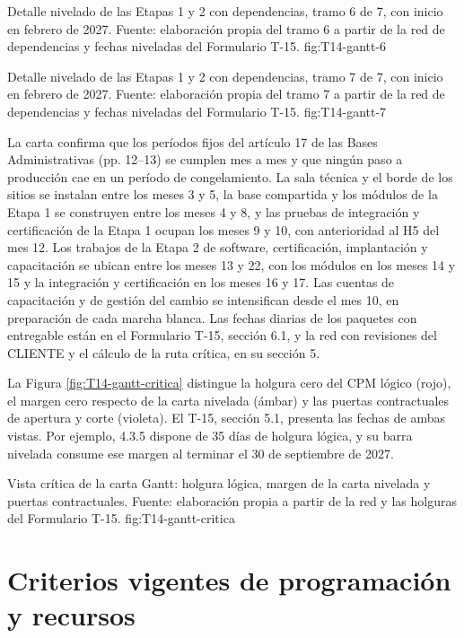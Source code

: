   {Detalle nivelado de las Etapas 1 y 2 con dependencias, tramo 6 de 7, con inicio en febrero de 2027. Fuente: elaboración propia del tramo 6 a partir de la red de dependencias y fechas niveladas del Formulario T-15.}
  {fig:T14-gantt-6}

  {Detalle nivelado de las Etapas 1 y 2 con dependencias, tramo 7 de 7, con inicio en febrero de 2027. Fuente: elaboración propia del tramo 7 a partir de la red de dependencias y fechas niveladas del Formulario T-15.}
  {fig:T14-gantt-7}

La carta confirma que los períodos fijos del artículo 17 de las Bases Administrativas (pp. 12--13) se cumplen mes a mes y que ningún paso a producción cae en un período de congelamiento. La sala técnica y el borde de los sitios se instalan entre los meses 3 y 5, la base compartida y los módulos de la Etapa 1 se construyen entre los meses 4 y 8, y las pruebas de integración y certificación de la Etapa 1 ocupan los meses 9 y 10, con anterioridad al H5 del mes 12. Los trabajos de la Etapa 2 de software, certificación, implantación y capacitación se ubican entre los meses 13 y 22, con los módulos en los meses 14 y 15 y la integración y certificación en los meses 16 y 17. Las cuentas de capacitación y de gestión del cambio se intensifican desde el mes 10, en preparación de cada marcha blanca. Las fechas diarias de los paquetes con entregable están en el Formulario T-15, sección 6.1, y la red con revisiones del CLIENTE y el cálculo de la ruta crítica, en su sección 5.

La Figura \ref{fig:T14-gantt-critica} distingue la holgura cero del CPM lógico (rojo), el margen cero respecto de la carta nivelada (ámbar) y las puertas contractuales de apertura y corte (violeta). El T-15, sección 5.1, presenta las fechas de ambas vistas. Por ejemplo, 4.3.5 dispone de 35 días de holgura lógica, y su barra nivelada consume ese margen al terminar el 30 de septiembre de 2027.

  {Vista crítica de la carta Gantt: holgura lógica, margen de la carta nivelada y puertas contractuales. Fuente: elaboración propia a partir de la red y las holguras del Formulario T-15.}
  {fig:T14-gantt-critica}

\section{Criterios vigentes de programación y recursos}

